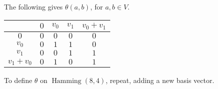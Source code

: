 \documentclass[a4paper,debug]{tufte-handout}
\DeclareMathOperator{\Hamming}{Hamming}
\begin{document}
\noindent 
The following gives $\theta(a,b)$, for $a,b\in V$.
\begin{center}
\begin{tabular}{c|cc|cc}
	\diagbox{a}{b} & $0$ & $v_0$ & $v_1$ & $v_0+v_1$ \\
	\hline
	$0$       		& $0$ & $0$ & $0$ & $0$ \\
	$v_0$     		& $0$ & $1$ & $1$ & $0$ \\
	\hline
	$v_1$     		& $0$ & $0$ & $1$ & $1$ \\
	$v_1+v_0$ 		& $0$ & $1$ & $0$ & $1$ \\
\end{tabular}
\end{center}

\noindent 
To define $\theta$ on $\Hamming(8,4)$, repeat, adding a new basis vector.



\end{document}
